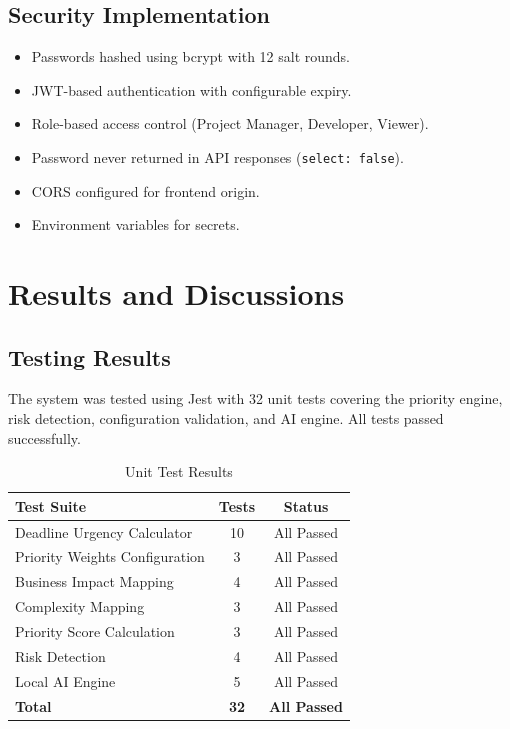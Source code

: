 \documentclass[12pt,a4paper,oneside]{report}
\begin{document}
\section{Security Implementation}

\begin{itemize}[noitemsep]
  \item Passwords hashed using bcrypt with 12 salt rounds.
  \item JWT-based authentication with configurable expiry.
  \item Role-based access control (Project Manager, Developer, Viewer).
  \item Password never returned in API responses (\texttt{select: false}).
  \item CORS configured for frontend origin.
  \item Environment variables for secrets.
\end{itemize}


\chapter{Results and Discussions}

\section{Testing Results}

The system was tested using Jest with 32 unit tests covering the priority engine, risk detection, configuration validation, and AI engine. All tests passed successfully.

\begin{table}[H]
\centering
\caption{Unit Test Results}
\label{tab:tests}
\begin{tabular}{|l|c|c|}
\hline
\textbf{Test Suite} & \textbf{Tests} & \textbf{Status} \\
\hline
Deadline Urgency Calculator   & 10 & All Passed \\
Priority Weights Configuration & 3  & All Passed \\
Business Impact Mapping        & 4  & All Passed \\
Complexity Mapping             & 3  & All Passed \\
Priority Score Calculation     & 3  & All Passed \\
Risk Detection                 & 4  & All Passed \\
Local AI Engine                & 5  & All Passed \\
\hline
\textbf{Total}                & \textbf{32} & \textbf{All Passed} \\
\hline
\end{tabular}
\end{table}
\end{document}
